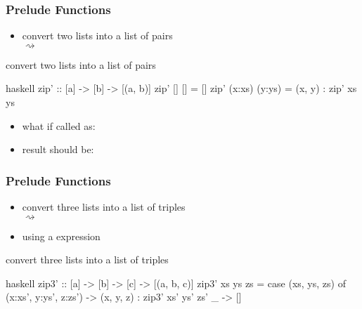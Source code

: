 \documentclass[dvipsnames]{beamer}
\theoremstyle{plain}
\begin{document}
\begin{frame}[fragile]
  \frametitle{Prelude Functions}

  \begin{itemize}
    \item convert two lists into a list of pairs\\
       $\rightsquigarrow$
  \end{itemize}

  \begin{exampleblock}{convert two lists into a list of pairs}
    \begin{pygments}{haskell}
zip' :: [a] -> [b] -> [(a, b)]
zip' [] [] = []
zip' (x:xs) (y:ys) = (x, y) : zip' xs ys
    \end{pygments}
  \end{exampleblock}

  \pause
  \begin{itemize}
    \item what if called as:\\
    \item result should be: 
  \end{itemize}
\end{frame}

\begin{frame}[fragile]
  \frametitle{Prelude Functions}

  \begin{itemize}
    \item convert three lists into a list of triples\\
       $\rightsquigarrow$
    \item using a  expression
  \end{itemize}

  \pause
  \begin{exampleblock}{convert three lists into a list of triples}
    \begin{pygments}{haskell}
zip3' :: [a] -> [b] -> [c] -> [(a, b, c)]
zip3' xs ys zs =
    case (xs, ys, zs) of
      (x:xs', y:ys', z:zs') ->
          (x, y, z) : zip3' xs' ys' zs'
      _ -> []
    \end{pygments}
  \end{exampleblock}
\end{frame}
\end{document}
